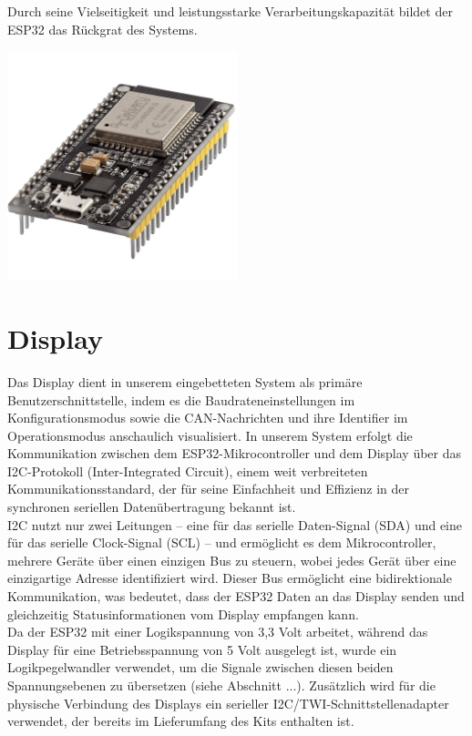 \noindent Durch seine Vielseitigkeit und leistungsstarke Verarbeitungskapazität bildet der ESP32 das Rückgrat des Systems.\\

\begin {centering}
\includegraphics[width=0.5\textwidth]{img/ESP32.png}
\label{fig: ESP32}
\end {centering}  

\section{Display}
\noindent Das Display dient in unserem eingebetteten System als primäre Benutzerschnittstelle, indem es die Baudrateneinstellungen im Konfigurationsmodus sowie die CAN-Nachrichten und ihre Identifier im Operationsmodus anschaulich visualisiert. In unserem System erfolgt die Kommunikation zwischen dem ESP32-Mikrocontroller und dem Display über das I2C-Protokoll (Inter-Integrated Circuit), einem weit verbreiteten Kommunikationsstandard, der für seine Einfachheit und Effizienz in der synchronen seriellen Datenübertragung bekannt ist.\\

\noindent I2C nutzt nur zwei Leitungen – eine für das serielle Daten-Signal (SDA) und eine für das serielle Clock-Signal (SCL) – und ermöglicht es dem Mikrocontroller, mehrere Geräte über einen einzigen Bus zu steuern, wobei jedes Gerät über eine einzigartige Adresse identifiziert wird. Dieser Bus ermöglicht eine bidirektionale Kommunikation, was bedeutet, dass der ESP32 Daten an das Display senden und gleichzeitig Statusinformationen vom Display empfangen kann. \\

\noindent Da der ESP32 mit einer Logikspannung von 3,3 Volt arbeitet, während das Display für eine Betriebsspannung von 5 Volt ausgelegt ist, wurde ein Logikpegelwandler verwendet, um die Signale zwischen diesen beiden Spannungsebenen zu übersetzen (siehe Abschnitt ...). Zusätzlich wird für die physische Verbindung des Displays ein serieller I2C/TWI-Schnittstellenadapter verwendet, der bereits im Lieferumfang des Kits enthalten ist.\\

